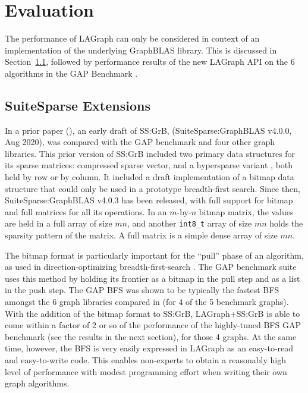 \section{Evaluation}
\label{sec:evaluation}

The performance of LAGraph can only be considered in context of an
implementation of the underlying GraphBLAS library.  This is discussed in
Section~\ref{sec:extensions}, followed by performance results of the new
LAGraph API on the 6 algorithms in the GAP Benchmark
\cite{DBLP:conf/sc/BeamerAP12}.

\subsection{SuiteSparse Extensions}
\label{sec:extensions}

In a prior paper (\cite{DBLP:conf/iiswc/AzadABBCDDDDFGG20}), an early draft of
SS:GrB, (SuiteSparse:GraphBLAS v4.0.0, Aug 2020), was compared with the GAP benchmark
\cite{DBLP:conf/sc/BeamerAP12} and four other graph libraries.  This prior
version of SS:GrB included two primary data structures for its sparse matrices:
compressed sparse vector, and a hypersparse variant
\cite{DBLP:conf/ipps/BulucG08}, both held by row or by column.  It included a
draft implementation of a bitmap data structure that could only be used in a
prototype breadth-first search.  Since then, SuiteSparse:GraphBLAS v4.0.3 has
been released, with full support for bitmap and full matrices for all its
operations.  In an $m$-by-$n$ bitmap matrix, the values are held in a full
array of size $mn$, and another \verb'int8_t' array of size $mn$ holds the
sparsity pattern of the matrix.  A full matrix is a simple dense array of size
$mn$.

The bitmap format is particularly important for the ``pull'' phase of an
algorithm, as used in direction-optimizing breadth-first-search
\cite{DBLP:conf/sc/BeamerAP12,DBLP:conf/icpp/YangBO18}.  The GAP benchmark suite uses this method by
holding its frontier as a bitmap in the pull step and as a list in the push
step. The GAP BFS was shown to be typically the fastest BFS amongst the 6 graph
libraries compared in \cite{DBLP:conf/iiswc/AzadABBCDDDDFGG20} (for 4 of the 5
benchmark graphs).  With the addition of the bitmap format to SS:GrB,
LAGraph+SS:GrB is able to come within a factor of 2 or so of the performance of
the highly-tuned BFS GAP benchmark (see the results in the next section), for
those 4 graphs.  At the same time, however, the BFS is very easily expressed in
LAGraph as an easy-to-read and easy-to-write code.  This enables non-experts to
obtain a reasonably high level of performance with modest programming effort
when writing their own graph algorithms.


